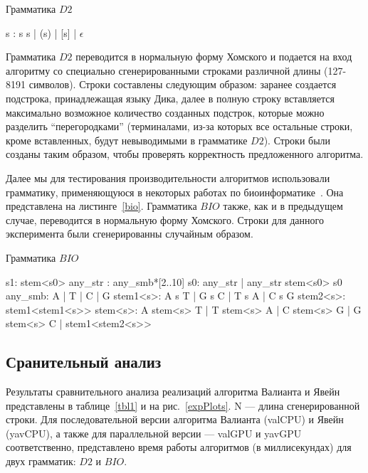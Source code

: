 \documentclass[14pt]{matmex-diploma-custom}
\begin{document}
\begin{listing}
\caption{Грамматика $D2$}

\quad\quad\quad\quad\quad\quad\quad\quad\quad\quad\quad\quad s : s s  |  (s) |  [s]  |  $\epsilon$

\label{dyck}
\end{listing} 

Грамматика $D2$ переводится в нормальную форму Хомского и подается на вход алгоритму со специально сгенерированными строками различной длины (127-8191 символов). Строки составлены следующим образом: заранее создается подстрока, принадлежащая языку Дика, далее в полную строку вставляется максимально возможное количество созданных подстрок, которые можно разделить “перегородками” (терминалами, из-за которых все остальные строки, кроме вставленных, будут невыводимыми в грамматике $D2$). Строки были созданы таким образом, чтобы проверять корректность предложенного алгоритма.

Далее мы для тестирования производительности алгоритмов использовали грамматику, применяющуюся в некоторых работах по биоинформатике~\cite{bioinformatics19}. Она представлена на листинге~\ref{bio}. Грамматика $BIO$ также, как и в предыдущем случае, переводится в нормальную форму Хомского. Строки для данного эксперимента были сгенерированны случайным образом.

\begin{listing}[h]
\caption{Грамматика $BIO$}
\begin{pyglist}[]
            s1: stem<s0>
            any_str : any_smb*[2..10]
            s0: any_str | any_str stem<s0> s0
            any_smb: A | T | C | G
            stem1<s>: A s T | G s C | T s A | C s G 
            stem2<s>: stem1<stem1<s>>
            stem<s>:  
                  A stem<s> T 
                | T stem<s> A 
                | C stem<s> G 
                | G stem<s> C 
                | stem1<stem2<s>>  
\end{pyglist}
\label{bio}
\end{listing}



\subsection{Сранительный анализ}

Результаты сравнительного анализа реализаций алгоритма Валианта и Явейн представлены в таблице~\ref{tbl1} и на рис.~\ref{expPlots}. N –-- длина сгенерированной строки. Для последовательной версии алгоритма Валианта (valCPU) и Явейн (yavCPU), а также для параллельной версии --- valGPU и yavGPU соответственно, представлено время работы алгоритмов (в миллисекундах) для двух грамматик: $D2$ и $BIO$.
\end{document}
